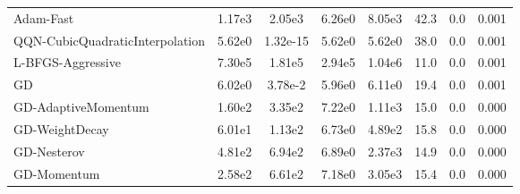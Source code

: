 \documentclass{article}
\begin{document}
\begin{table}[htbp]
{\begin{tabular}{p{2.5cm}*{7}{c}}
Adam-Fast & 1.17e3 & 2.05e3 & 6.26e0 & 8.05e3 & 42.3 & 0.0 & 0.001 \\
QQN-CubicQuadraticInterpolation & 5.62e0 & 1.32e-15 & 5.62e0 & 5.62e0 & 38.0 & 0.0 & 0.001 \\
L-BFGS-Aggressive & 7.30e5 & 1.81e5 & 2.94e5 & 1.04e6 & 11.0 & 0.0 & 0.001 \\
GD & 6.02e0 & 3.78e-2 & 5.96e0 & 6.11e0 & 19.4 & 0.0 & 0.001 \\
GD-AdaptiveMomentum & 1.60e2 & 3.35e2 & 7.22e0 & 1.11e3 & 15.0 & 0.0 & 0.000 \\
GD-WeightDecay & 6.01e1 & 1.13e2 & 6.73e0 & 4.89e2 & 15.8 & 0.0 & 0.000 \\
GD-Nesterov & 4.81e2 & 6.94e2 & 6.89e0 & 2.37e3 & 14.9 & 0.0 & 0.000 \\
GD-Momentum & 2.58e2 & 6.61e2 & 7.18e0 & 3.05e3 & 15.4 & 0.0 & 0.000 \\
\bottomrule
\end{tabular}
}
\end{table}
\end{document}
